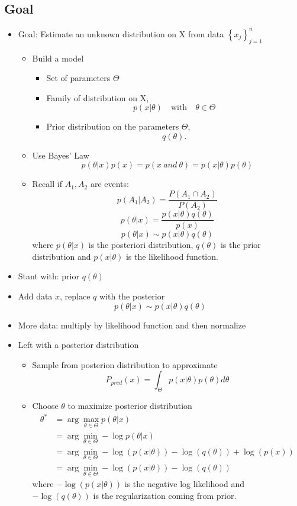 \subsection{Goal}
\begin{itemize}
	\item Goal: Estimate an unknown distribution on X from data $\left\{x_{j}\right\}_{j=1}^{n}$
	\begin{itemize}
		\item Build a model 
	    \begin{itemize}
	    	\item Set of parameters $\Theta$
	    	\item Family of distribution on X, 
		$$p(x|\theta)\quad \mbox{with}\quad \theta \in \Theta $$
	    	\item Prior distribution on the parameters $\Theta$, 
		$$
		q(\theta).
		$$
	    \end{itemize}
    \item Use Bayes' Law 
    $$
    p(\theta|x) p(x)=p(x \  and \   \theta )=p(x | \theta) p(\theta)
    $$
    \item Recall if $A_{1} , A_{2}$ are events:    
    $$
    p\left(A_{1} | A_{2}\right)=\frac{P\left(A_{1} \cap A_{2}\right)}{P\left(A_{2}\right)}
    $$
    $$
    p(\theta | x)=\frac{p(x | \theta) q(\theta)}{p(x)}
    $$
    $$
    p(\theta |x) \sim p(x | \theta) q(\theta)
    $$
    where $p(\theta |x)$ is the posteriori distribution, $q(\theta)$ is the prior distribution and $p(x | \theta)$ is the likelihood function.
	\end{itemize}
\item Stant with: prior $q(\theta)$  
\item Add data $x$, replace $q$ with the posterior
 $$
 p(\theta | x) \sim p(x | \theta) q(\theta)
 $$
\item More data: multiply by likelihood function and then normalize
\item Left with a posterior distribution
     \begin{itemize}
	\item Sample from posterion distribution to approximate
	$$
	P_{pred}(x)=\int_{\Theta} p(x | \theta) p(\theta) d \theta
	$$ 
	\item Choose $\theta $ to maximize posterior distribution  
	\begin{align*}
	\theta^{*}&=\arg \max _{\theta \in \Theta} p(\theta|x)\\
 &=\arg \min _{\theta \in \Theta}-\log p(\theta|x)\\
&=\arg \min _{\theta \in \Theta}-\log (p(x | \theta))-\log (q(\theta))+\log (p(x))\\
&=\arg \min _{\theta \in \Theta}-\log (p(x | \theta))-\log (q(\theta))
\end{align*}
where $-\log (p(x | \theta))$ is the negative log likelihood and $ -\log (q(\theta))$ is the regularization coming from prior.
    \end{itemize}

\end{itemize}
